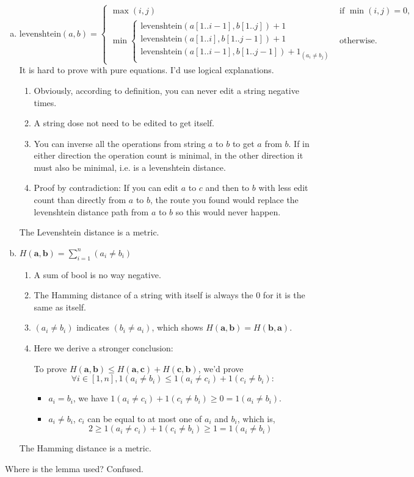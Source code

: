 \documentclass{article}
\begin{document}
\begin{enumerate}[a.]
		Cosine distance is not a metric. 
		\item 
		$$
		\text{levenshtein}(a, b) = \begin{cases}
			\max(i, j) & \text{if } \min(i, j) = 0,\\
			\min \begin{cases}
				\text{levenshtein}(a[1..i-1], b[1..j]) + 1\\
				\text{levenshtein}(a[1..i], b[1..j-1]) + 1\\
				\text{levenshtein}(a[1..i-1], b[1..j-1]) + 1_{(a_i \neq b_j)}
			\end{cases} & \text{otherwise}.
		\end{cases}
		$$
		It is hard to prove with pure equations. I'd use logical explanations. 
		\begin{enumerate}[1)]
			\item Obviously, according to definition, you can never edit a string negative times. 
			\item A string dose not need to be edited to get itself.
			\item You can inverse all the operations from string $a$ to $b$ to get $a$ from $b$. If in either direction the operation count is minimal, in the other direction it must also be minimal, i.e. is a levenshtein distance. 
			\item Proof by contradiction: If you can edit $a$ to $c$ and then to $b$ with less edit count than directly from $a$ to $b$, the route you found would replace the levenshtein distance path from $a$ to $b$ so this would never happen.
		\end{enumerate}
		The Levenshtein distance is a metric.
		
		\item
		$H(\mathbf{a}, \mathbf{b}) = \sum_{i=1}^{n} (a_i \neq b_i)$ 
		\begin{enumerate}[1)]
			\item A sum of bool is no way negative.
			\item The Hamming distance of a string with itself is always the 0 for it is the same as itself. 
			\item $(a_i \neq b_i)$ indicates $(b_i \neq a_i)$, which shows $H(\mathbf{a}, \mathbf{b})=H(\mathbf{b}, \mathbf{a})$.
			\item Here we derive a stronger conclusion:
			
			To prove $H(\mathbf{a}, \mathbf{b}) \leq H(\mathbf{a}, \mathbf{c})+H(\mathbf{c}, \mathbf{b})$, we'd prove
			$$\forall i \in [1, n], 1(a_i \neq b_i)\leq 1(a_i \neq c_i)+1(c_i \neq b_i):$$
			\begin{itemize}
				\item $a_i = b_i$, we have $1(a_i \neq c_i)+1(c_i \neq b_i) \geq 0=1(a_i \neq b_i)$.
				\item $a_i \neq b_i$, $c_i$ can be equal to at most one of $a_i$ and $b_i$, which is,
				$$2\geq1(a_i \neq c_i)+1(c_i \neq b_i) \geq 1=1(a_i \neq b_i)$$
			\end{itemize}
		\end{enumerate}
		The Hamming distance is a metric.
	\end{enumerate}
	Where is the lemma used? Confused. 
	
\end{document}
